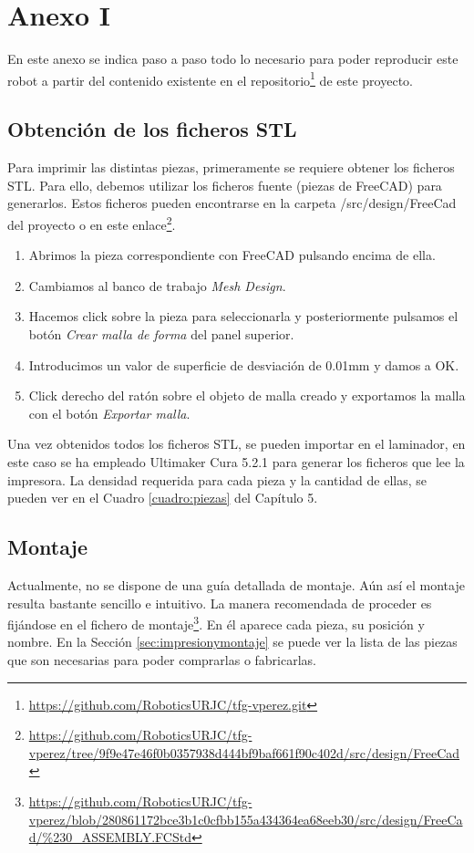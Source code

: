\chapter*{Anexo I}
\label{cap:anexoi}

\noindent En este anexo se indica paso a paso todo lo necesario para poder reproducir este robot a partir del contenido 
existente en el repositorio\footnote{\url{https://github.com/RoboticsURJC/tfg-vperez.git}} de este proyecto.

\section*{Obtención de los ficheros STL}
\noindent Para imprimir las distintas piezas, primeramente se requiere obtener los ficheros STL. Para ello, 
debemos utilizar los ficheros fuente (piezas de FreeCAD) para generarlos. Estos ficheros pueden 
encontrarse en la carpeta /src/design/FreeCad del proyecto o en este enlace\footnote{\url{https://github.com/RoboticsURJC/tfg-vperez/tree/9f9e47e46f0b0357938d444bf9baf661f90c402d/src/design/FreeCad}}.
\begin{enumerate}
\item Abrimos la pieza correspondiente con FreeCAD pulsando encima de ella.
\item Cambiamos al banco de trabajo \textit{Mesh Design}.
\item Hacemos click sobre la pieza para seleccionarla y posteriormente pulsamos el botón \textit{Crear malla de forma} del panel superior.
\item Introducimos un valor de superficie de desviación de 0.01mm y damos a OK.
\item Click derecho del ratón sobre el objeto de malla creado y exportamos la malla con el botón \textit{Exportar malla}. 
    
\end{enumerate}

Una vez obtenidos todos los ficheros STL, se pueden importar en el laminador, en este caso se ha empleado 
Ultimaker Cura 5.2.1 para generar los ficheros que lee la impresora. La densidad requerida para cada pieza 
y la cantidad de ellas, se pueden ver en el Cuadro \ref{cuadro:piezas} del Capítulo 5.

\newpage
\section*{Montaje}
\noindent Actualmente, no se dispone de una guía detallada de montaje. Aún así el montaje resulta bastante sencillo 
e intuitivo. La manera recomendada de proceder es fijándose en el fichero de 
montaje\footnote{\url{https://github.com/RoboticsURJC/tfg-vperez/blob/280861172bce3b1c0cfbb155a434364ea68eeb30/src/design/FreeCad/\%230\_ASSEMBLY.FCStd}}. En él 
aparece cada pieza, su posición y nombre. En la Sección \ref{sec:impresionymontaje} se puede ver la lista de las piezas que 
son necesarias para poder comprarlas o fabricarlas.

